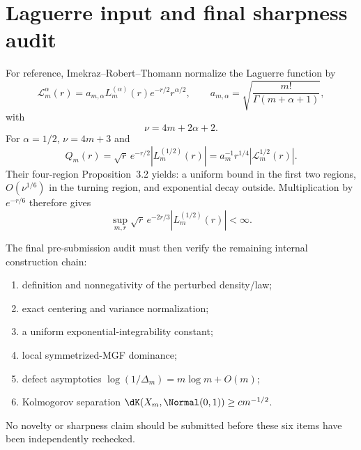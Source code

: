 \section{Laguerre input and final sharpness audit}\label{app:laguerre}

For reference, Imekraz--Robert--Thomann normalize the Laguerre function by
\[
\mathcal L_m^\alpha(r)
=a_{m,\alpha}L_m^{(\alpha)}(r)e^{-r/2}r^{\alpha/2},
\qquad
a_{m,\alpha}=\sqrt{\frac{m!}{\Gamma(m+\alpha+1)}},
\]
with
\[
\nu=4m+2\alpha+2.
\]
For $\alpha=1/2$, $\nu=4m+3$ and
\[
Q_m(r)=\sqrt r\,e^{-r/2}|L_m^{(1/2)}(r)|
=a_m^{-1}r^{1/4}|\mathcal L_m^{1/2}(r)|.
\]
Their four-region Proposition~3.2 yields: a uniform bound in the first two regions, $O(\nu^{1/6})$ in the turning region, and exponential decay outside. Multiplication by $e^{-r/6}$ therefore gives
\[
\sup_{m,r}\sqrt r\,e^{-2r/3}|L_m^{(1/2)}(r)|<\infty.
\]

The final pre-submission audit must then verify the remaining internal construction chain:
\begin{enumerate}
\item definition and nonnegativity of the perturbed density/law;
\item exact centering and variance normalization;
\item a uniform exponential-integrability constant;
\item local symmetrized-MGF dominance;
\item defect asymptotics $\log(1/\Delta_m)=m\log m+O(m)$;
\item Kolmogorov separation $\dK(X_m,\Normal(0,1))\ge c m^{-1/2}$.
\end{enumerate}
No novelty or sharpness claim should be submitted before these six items have been independently rechecked.
